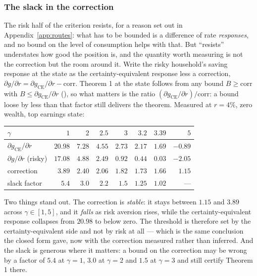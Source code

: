 \subsubsection*{The slack in the correction}

The risk half of the criterion resists, for a reason set out in Appendix~\ref{app:routes}: what has
to be bounded is a difference of rate \emph{responses}, and no bound on the level of consumption helps
with that. But ``resists'' understates how good the position is, and the quantity worth measuring is
not the correction but the room around it. Write the risky household's saving response at the state
as the certainty-equivalent response less a correction,
$\partial g/\partial r=\partial g_{\mathrm{CE}}/\partial r-\mathrm{corr}$. Theorem 1 at the state
follows from any bound $B\ge\mathrm{corr}$ with $B\le\partial g_{\mathrm{CE}}/\partial r$
(), so what matters is the ratio
$(\partial g_{\mathrm{CE}}/\partial r)/\mathrm{corr}$: a bound loose by less than that factor still
delivers the theorem. Measured at $r=4\%$, zero wealth, top earnings state:

\begin{center}
\begin{tabular}{lrrrrrrr}
\toprule
$\gamma$ & $1$ & $2$ & $2.5$ & $3$ & $3.2$ & $3.39$ & $5$\\
\midrule
$\partial g_{\mathrm{CE}}/\partial r$ & $20.98$ & $7.28$ & $4.55$ & $2.73$ & $2.17$ & $1.69$ & $-0.89$\\
$\partial g/\partial r$ (risky) & $17.08$ & $4.88$ & $2.49$ & $0.92$ & $0.44$ & $0.03$ & $-2.05$\\
correction & $3.89$ & $2.40$ & $2.06$ & $1.82$ & $1.73$ & $1.66$ & $1.15$\\
\midrule
slack factor & $\mathbf{5.4}$ & $\mathbf{3.0}$ & $\mathbf{2.2}$ & $\mathbf{1.5}$ & $1.25$ & $1.02$ & ---\\
\bottomrule
\end{tabular}
\end{center}

Two things stand out. The correction is \emph{stable}: it stays between $1.15$ and $3.89$ across
$\gamma\in[1,5]$, and it \emph{falls} as risk aversion rises, while the certainty-equivalent response
collapses from $20.98$ to below zero. The threshold is therefore set by the certainty-equivalent side
and not by risk at all --- which is the same conclusion the closed form gave, now with the correction
measured rather than inferred. And the slack is generous where it matters: a bound on the correction
may be wrong by a factor of $5.4$ at $\gamma=1$, $3.0$ at $\gamma=2$ and $1.5$ at $\gamma=3$ and
still certify Theorem 1 there.

